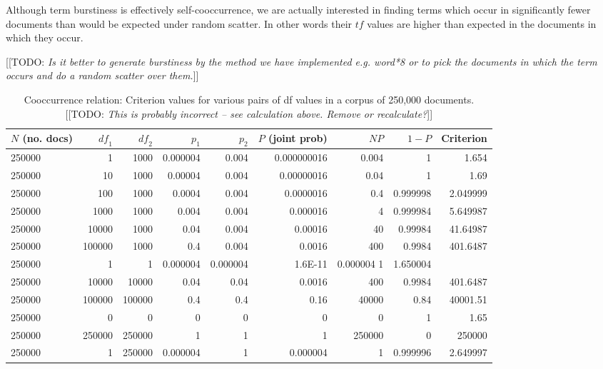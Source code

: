 \documentclass[11pt]{report}
\newcommand{\todo}[1]{{\color{blue}[[TODO: {\emph{#1}}]]}}
\begin{document}
Although term burstiness is effectively self-cooccurrence, we are
actually interested in finding terms which occur in significantly
fewer documents than would be expected under random scatter.  In other
words their $\mathit{tf}$ values are higher than expected in the
documents in which they occur.
  
\todo{Is it better to generate burstiness by the method we have
  implemented e.g. word*8 or to pick the documents in which the term
  occurs and do a random scatter over them.}



\begin{table} \tiny
\centering
\caption{Cooccurrence relation: Criterion values for various pairs of df values in a corpus
of 250,000 documents.  \todo{This is probably incorrect -- see
  calculation above.  Remove or recalculate?}
\label{Critvals}}
\begin{tabular}[ht]{lrrrrrrrr}
$N$ (no. docs)	&$\mathit{df}_1$ &$\mathit{df}_2$ &$p_1$	&$p_2$	&$P$ (joint prob)	&$NP$&$1 -P$	 &Criterion\\
\hline
250000	&1	&1000	&0.000004  &0.004	&0.000000016	&0.004	&1	&1.654\\
250000	&10	&1000	&0.00004   &0.004	&0.00000016	&0.04	&1	&1.69\\
250000	&100	&1000	&0.0004	   &0.004	&0.0000016	&0.4	&0.999998	&2.049999\\
250000	&1000	&1000	&0.004	   &0.004	&0.000016	&4	&0.999984	&5.649987\\
250000	&10000	&1000	&0.04	   &0.004	&0.00016	&40	&0.99984	&41.64987\\
250000	&100000	&1000	&0.4	   &0.004	&0.0016	        &400	&0.9984	&401.6487\\
250000	&1	&1	&0.000004  &0.000004	&1.6E-11	&0.000004	1	&1.650004\\
250000	&10000	&10000	&0.04	   &0.04	&0.0016	        &400	&0.9984	&401.6487\\
250000	&100000	&100000	&0.4	   &0.4	        &0.16	        &40000	&0.84	&40001.51\\
250000	&0	&0	&0	   &0	        &0	        &0	&1	&1.65\\
250000	&250000	&250000	&1	   &1	        &1	        &250000	&0	&250000\\
250000 	&1	&250000	&0.000004  &1	        &0.000004	&1
&0.999996	&2.649997\\
\hline
\end{tabular}
\end{table}
\end{document}
